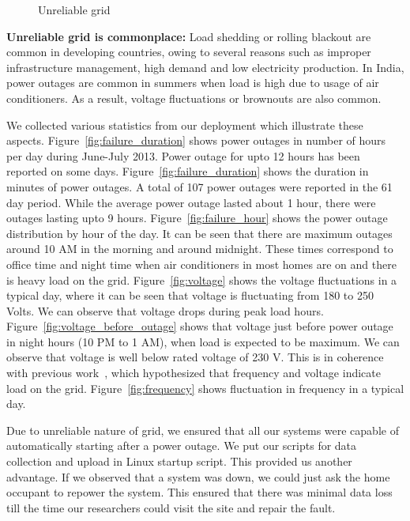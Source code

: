 \documentclass[10pt]{sensys-proc}
\newcommand{\figref}[1]{Figure~\ref{#1}}
\begin{document}
\begin{figure}[t!]
     \vspace{-3mm}
   
    \caption{Unreliable grid}

    \label{fig:unreliable}

\end{figure}
\noindent \textbf{Unreliable grid is commonplace:} Load shedding or rolling blackout are common in developing countries, owing to several reasons such as improper infrastructure management, high demand and low electricity production. In India, power outages are common in summers when load is high due to usage of air conditioners. As a result, voltage fluctuations or brownouts are also common.

\noindent We collected various statistics from our deployment which illustrate these aspects. \figref{fig:failure_duration} shows power outages in number of hours per day during June-July 2013. Power outage for upto 12 hours has been reported on some days. \figref{fig:failure_duration} shows the duration in minutes of power outages. A total of 107 power outages were reported in the 61 day period. While the average power outage lasted about 1 hour, there were outages lasting upto 9 hours. \figref{fig:failure_hour} shows the power outage distribution by hour of the day. It can be seen that there are maximum outages around 10 AM in the morning and around midnight. These times correspond to office time and night time when air conditioners in most homes are on and there is heavy load on the grid. \figref{fig:voltage} shows the voltage fluctuations in a typical day, where it can be seen that voltage is fluctuating from 180 to 250 Volts. We can observe that voltage drops during peak load hours. \figref{fig:voltage_before_outage} shows that voltage just before power outage in night hours (10 PM to 1 AM), when load is expected to be maximum. We can observe that voltage is well below rated voltage of 230 V. This is in coherence with previous work~\cite{nplug}, which hypothesized that frequency and voltage indicate load on the grid. \figref{fig:frequency} shows fluctuation in frequency in a typical day.

\noindent Due to unreliable nature of grid, we ensured that all our systems were capable of automatically starting after a power outage. We put our scripts for data collection and upload in Linux startup script. This provided us another advantage. If we observed that a system was down, we could just ask the home occupant to repower the system. This ensured that there was minimal data loss till the time our researchers could visit the site and repair the fault.
\end{document}
